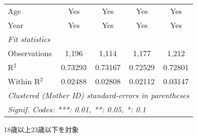 \documentclass{article}
\begin{document}
\begin{landscape}
\begin{threeparttable}[b]
\begin{tabular}{lcccc}
      Age                                           & Yes           & Yes           & Yes           & Yes\\  
      Year                                          & Yes           & Yes           & Yes           & Yes\\  
      \midrule
      \emph{Fit statistics}\\
      Observations                                  & 1,196         & 1,114         & 1,177         & 1,212\\  
      R$^2$                                         & 0.73293       & 0.73167       & 0.72529       & 0.72801\\  
      Within R$^2$                                  & 0.02488       & 0.02808       & 0.02112       & 0.03147\\  
      \midrule \midrule
      \multicolumn{5}{l}{\emph{Clustered (Mother ID) standard-errors in parentheses}}\\
      \multicolumn{5}{l}{\emph{Signif. Codes: ***: 0.01, **: 0.05, *: 0.1}}\\
   \end{tabular}
   
   \begin{tablenotes}\item 18歳以上23歳以下を対象
   \end{tablenotes}
\end{threeparttable}
\par\endgroup


\end{landscape}
\end{document}
